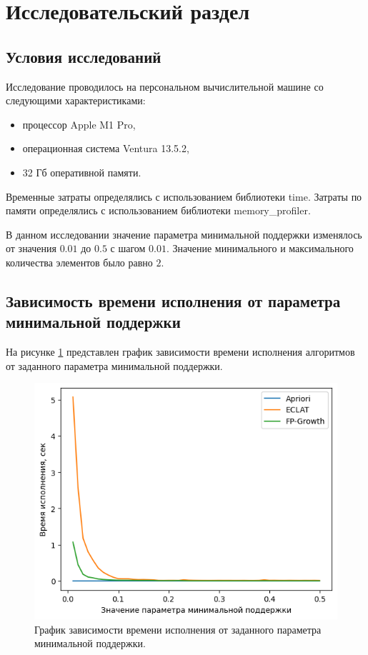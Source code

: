 \section{Исследовательский раздел}
\subsection{Условия исследований}
Исследование проводилось на персональном вычислительной машине со следующими характеристиками:

\begin{itemize}
\item процессор Apple M1 Pro,
\item операционная система Ventura 13.5.2,
\item 32 Гб оперативной памяти.
\end{itemize}

Временные затраты определялись с использованием библиотеки time. Затраты по памяти определялись с использованием библиотеки memory_profiler.

В данном исследовании значение параметра минимальной поддержки изменялось от значения $0.01$ до $0.5$ с шагом $0.01$. Значение минимального и максимального количества элементов было равно $2$.

\subsection{Зависимость времени исполнения от параметра минимальной поддержки}

На рисунке \ref{img:time} представлен график зависимости времени исполнения алгоритмов от заданного параметра минимальной поддержки.

\begin{figure}[H]
	\centering
	\includegraphics[width=\textwidth]{inc/time.png}
	\caption{ График зависимости времени исполнения от заданного параметра минимальной поддержки.}
	\label{img:time}
\end{figure}


